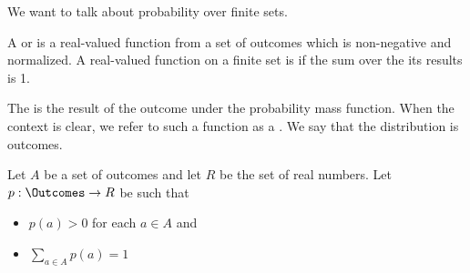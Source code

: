 

We want to talk about
probability over finite
sets.


A
or
is a real-valued function
from a set of outcomes which is
non-negative and normalized.
A real-valued function on a finite set
is  if the sum over the
its results is 1.

The 
is the result of the outcome
under the probability mass function.
When the context is clear, we refer
to such a function as a .
We say that the distribution is 
outcomes.


Let $A$ be a set of outcomes and
let $R$ be the set of real numbers.
Let $p: \Outcomes \to R$ be such that

\begin{itemize}

\item $p(a) > 0$ for each $a \in A$ and
\item $\sum_{a \in A} p(a) = 1$

\end{itemize}
